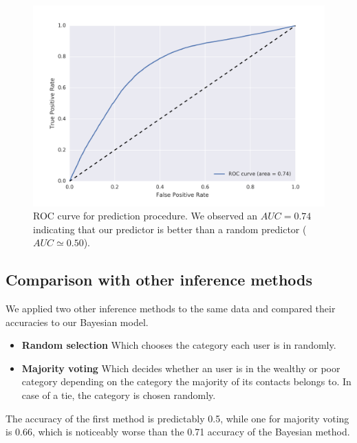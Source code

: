 \begin{figure}[H]
\begin{center}
\includegraphics[width=\columnwidth]{figures/ROC_BETA/ROC_Beta_based_approach_201504.png}
\caption{ROC curve for prediction procedure. We observed an $AUC = 0.74$ indicating that our predictor is better than a random predictor ($AUC \simeq 0.50$).}
\label{ROC_multiclass}
\end{center}
\end{figure}

%
%
%

\subsection{Comparison with other inference methods}

We applied two other inference methods to the same data and compared their accuracies to our Bayesian model.

\begin{itemize}
	\item \textbf{Random selection} Which chooses the category each user is in randomly.
	\item \textbf{Majority voting} Which decides whether an user is in the wealthy or poor category depending on the category the majority of its contacts belongs to. In case of a tie, the category is chosen randomly.
\end{itemize}

The accuracy of the first method is predictably \num{0.5}, while one for majority voting is \num{0.66}, which is noticeably worse than the \num{0.71} accuracy of the Bayesian method.
